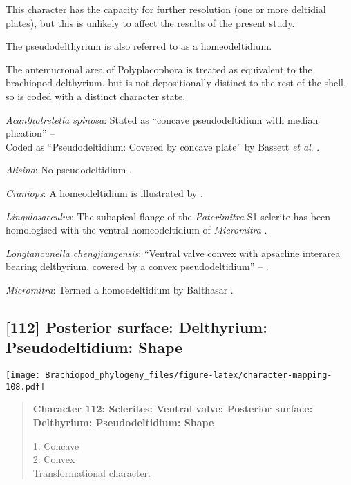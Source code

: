 \documentclass[openany]{book}
\theoremstyle{definition}
\theoremstyle{definition}
\theoremstyle{definition}
\theoremstyle{remark}
\begin{document}
This character has the capacity for further resolution (one or more
deltidial plates), but this is unlikely to affect the results of the
present study.

The pseudodelthyrium is also referred to as a homeodeltidium.

The antemucronal area of Polyplacophora is treated as equivalent to the
brachiopod delthyrium, but is not depositionally distinct to the rest of
the shell, so is coded with a distinct character state.

\hypertarget{Acanthotretella_spinosa-coding-111}{}
\emph{Acanthotretella spinosa}: Stated as ``concave pseudodeltidium with
median plication'' -- \citet{Williams2000LinguliformeaCraniiformea}\\
Coded as ``Pseudodeltidium: Covered by concave plate'' by Bassett
\emph{et al}. \citeyearpar{Bassett2001Functionalmorphology}.

\hypertarget{Alisina-coding-111}{}
\emph{Alisina}: No pseudodeltidium
\citep[p.~153]{Williams2000LinguliformeaCraniiformea}.

\hypertarget{Craniops-coding-111}{}
\emph{Craniops}: A homeodeltidium is illustrated by
\citet{Hanken1985Thetaxonomy}.

\hypertarget{Lingulosacculus-coding-111}{}
\emph{Lingulosacculus}: The subapical flange of the \emph{Paterimitra}
S1 sclerite has been homologised with the ventral homeodeltidium of
\emph{Micromitra} \citep{Larsson2014iPaterimitra}.

\hypertarget{Longtancunella_chengjiangensis-coding-111}{}
\emph{Longtancunella chengjiangensis}: ``Ventral valve convex with
apsacline interarea bearing delthyrium, covered by a convex
pseudodeltidium'' -- \citet{Holmer2008TheEarly}.

\hypertarget{Micromitra-coding-111}{}
\emph{Micromitra}: Termed a homoedeltidium by Balthasar
\citeyearpar{Balthasar2004Shellstructure}.

\subsection*{{[}112{]} Posterior surface: Delthyrium: Pseudodeltidium:
Shape}\label{posterior-surface-delthyrium-pseudodeltidium-shape}

\texttt{[image: Brachiopod\_phylogeny\_files/figure-latex/character-mapping-108.pdf]}

\begin{quote}
\textbf{Character 112: Sclerites: Ventral valve: Posterior surface:
Delthyrium: Pseudodeltidium: Shape}

1: Concave\\
2: Convex\\
Transformational character.
\end{quote}
\end{document}
